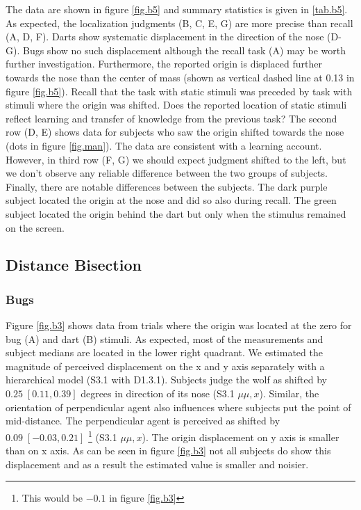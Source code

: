 \documentclass[10pt]{article}
\begin{document}
The data are shown in figure \ref{fig.b5} and summary statistics is given in \ref{tab.b5}. 
As expected, the localization judgments (B, C, E, G) are more precise than recall (A, D, F). Darts show systematic displacement in the direction of the nose (D-G). 
Bugs show no such displacement although the recall task (A) may be worth further investigation. 
Furthermore, the reported origin is displaced further towards the nose than the center of mass (shown as vertical dashed line at 0.13 in figure \ref{fig.b5}). 
Recall that the task with static stimuli was preceded by task with stimuli where the origin was shifted. 
Does the reported location of static stimuli reflect learning and transfer of knowledge from the previous task? 
The second row (D, E) shows data for subjects who saw the origin shifted towards the nose (dots in figure \ref{fig.man}). 
The data are consistent with a learning account. 
However, in third row (F, G) we should expect judgment shifted to the left, but we don't observe any reliable difference between the two groups of subjects. 
Finally, there are notable differences between the subjects. 
The dark purple subject located the origin at the nose and did so also during recall. 
The green subject located the origin behind the dart but only when the stimulus remained on the screen. 

\subsection*{Distance Bisection}
\subsubsection*{Bugs}
Figure \ref{fig.b3} shows data from trials where the origin was located at the zero for bug (A) and dart (B) stimuli. 
As expected, most of the measurements and subject medians are located in the lower right quadrant.
We estimated the magnitude of perceived displacement on the x and y axis separately with a hierarchical model (S3.1 with D1.3.1). Subjects judge the wolf as shifted by $0.25 \; [0.11,0.39]$ degrees in direction of its nose (S3.1 $\mu{\mu,x}$). Similar, the orientation of perpendicular agent also influences where subjects put the point of mid-distance. The perpendicular agent is perceived as shifted by $0.09\; [-0.03,0.21]$ \footnote{This would be $-0.1$ in figure \ref{fig.b3}} (S3.1 $\mu{\mu,x}$). The origin displacement on y axis is smaller than on x axis. As can be seen in figure \ref{fig.b3} not all subjects do show this displacement and as a result the estimated value is smaller and noisier.\\
\end{document}
